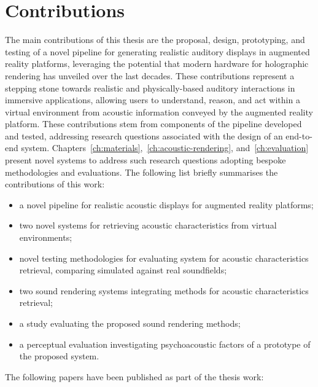 \section{Contributions}
The main contributions of this thesis are the proposal, design, prototyping, and testing of a novel pipeline for generating realistic auditory displays in augmented reality platforms, leveraging the potential that modern hardware for holographic rendering has unveiled over the last decades. These contributions represent a stepping stone towards realistic and physically-based auditory interactions in immersive applications, allowing users to understand, reason, and act within a virtual environment from acoustic information conveyed by the augmented reality platform.
These contributions stem from components of the pipeline developed and tested, addressing research questions associated with the design of an end-to-end system. Chapters~\ref{ch:materials},~\ref{ch:acoustic-rendering}, and~\ref{ch:evaluation} present novel systems to address such research questions adopting bespoke methodologies and evaluations. The following list briefly summarises the contributions of this work:
\begin{itemize}
    \item a novel pipeline for realistic acoustic displays for augmented reality platforms;
    \item two novel systems for retrieving acoustic characteristics from virtual environments;
    \item novel testing methodologies for evaluating system for acoustic characteristics retrieval, comparing simulated against real soundfields;
    \item two sound rendering systems integrating methods for acoustic characteristics retrieval;
    \item a study evaluating the proposed sound rendering methods;
    \item a perceptual evaluation investigating psychoacoustic factors of a prototype of the proposed system.
\end{itemize}

The following papers have been published as part of the thesis work:

